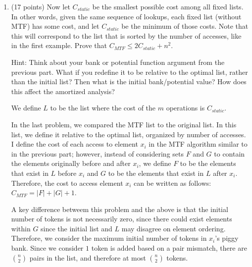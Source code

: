 \documentclass[11pt]{article}
\begin{document}
\begin{enumerate}
$C_{MTF} \leq (2i_1 + 2i_2 + 2i_3 + ... + 2i_m)$

Now summing the initial algorithm, since the list nevver changes:

$C_{init} = i_1 + i_2 + i_3 + ... + i_m$

Putting this together:

$C_{MTF} \leq (2i_1 + 2i_2 + 2i_3 + ... + 2i_m) = 2 \cdot C_{init}$

Therefore:

$C_{MTF} \leq 2 \cdot C_{init}$

\item (17 points) Now let $C_{static}$ be the smallest possible cost among all fixed lists.  In other words, given the same sequence of lookups, 
each fixed list (without MTF) has some cost, and let $C_{static}$ be the minimum of those costs. 
Note that this will correspond to the list that is sorted by the number of accesses, like in the first example.  Prove that $C_{MTF} \leq 2C_{static} + n^2$.

Hint: Think about your bank or potential function argument from the previous part. 
What if you redefine it to be relative to the optimal list, rather than the initial list?  Then what is the initial bank/potential value? 
How does this affect the amortized analysis?

We define $L$ to be the list where the cost of the $m$ operations is $C_{static}$.

In the last problem, we compared the MTF list to the original list. In this list, we define it relative to the optimal list,  organized by number of accesses. 
I define the cost of each access to element $x_i$ in the MTF algorithm similar to in the previous part; 
however, instead of considering sets $F$ and $G$ to contain the elements originally before and after $x_i$, 
we define $F$ to be the elements that exist in $L$ before $x_i$ and $G$ to be the elements that exist in $L$ after $x_i$. 
Therefore, the cost to access element $x_i$ can be written as follows: $C_{MTF} = |F| + |G| + 1$. 

A key difference betweem this problem and the above is that the initial number of tokens is not necessarily zero, 
since there could exist elements within $G$ since the initial list and $L$ may disagree on element ordering. 
Therefore, we consider the maximum initial number of tokens in $x_i$'s piggy bank. 
Since we consider $1$ token is added based on a pair mismatch, there are $\binom{n}{2}$ pairs in the list, and therefore at most $\binom{n}{2}$ tokens. 


\end{enumerate}
\end{document}
